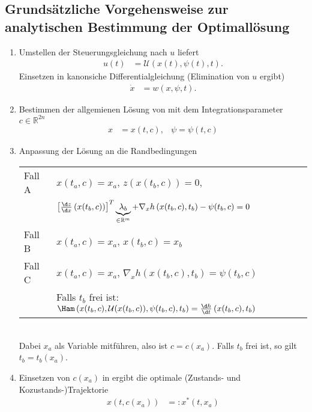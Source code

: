 \subsection{Grundsätzliche Vorgehensweise zur analytischen Bestimmung der Optimallösung}
\begin{enumerate}[label=(S\arabic*)]
  \item Umstellen der Steuerungsgleichung nach $u$ liefert 
  \begin{align}
  	u(t) & = \mathcal{U}\left(x(t),\psi(t),t \right). \label{eqn:kap_2_vor_optlsg_s1_u}
  \end{align}
  Einsetzen in kanonsiche Differentialgleichung (Elimination von $u$ ergibt)
  \begin{align}
  	\dot{x} & = w(x,\psi,t). \label{eqn:kap_2_vor_optlsg_s1_x}
  \end{align}
  \item Bestimmen der allgemienen Lösung von  mit dem Integrationsparameter $c\in\mathbb{R}^{2n}$
  \begin{align}
  	x & = x(t,c), & \psi=\psi(t,c)	\label{eqn:kap_2_vor_optlsg_s2}
  \end{align}
  \item Anpassung der Lösung an die Randbedingungen\\
  \begin{tabular}{ll}
  Fall A	& $x(t_a,c)=x_a$, $z\left(x(t_b,c) \right)=0$,\\ 
  			& $\left[\frac{\d z}{\d x}\left(x(t_b,c) \right) \right]^T\underbrace{\lambda_b}_{\in\mathbb{R}^m}+\nabla_x h\left(x(t_b,c),t_b
  			\right)-\psi(t_b,c)=0$\\
  Fall B	& $x(t_a,c)=x_a$, $x(t_b,c)=x_b$\\
  Fall C	& $x(t_a,c)=x_a$, $\nabla_x h\left(x(t_b,c),t_b \right) = \psi(t_b,c)$\\
  			& Falls $t_b$ frei ist: $\Ham\left(x(t_b,c),\mathcal{U}(x(t_b,c)),\psi(t_b,c),t_b \right)=\frac{\d h}{\d t}\left(x(t_b,c),t_b \right)$
  \end{tabular}\\
  Dabei $x_a$ als Variable mitführen, also ist $c=c(x_a)$. Falls $t_b$ frei ist, so gilt $t_b=t_b(x_a)$.
  \item Einsetzen von $c(x_a)$ in  ergibt die optimale (Zustands- und Kozustands-)Trajektorie 
  \begin{align}
  	x\left(t,c(x_a) \right) & =: x^{\ast}(t,x_a)	\label{eqn:kap_2_vor_optlsg_s4}
  \end{align}

\end{enumerate}
